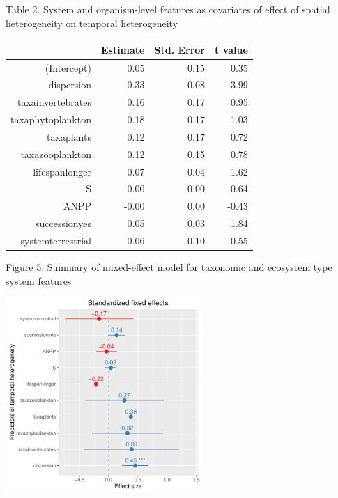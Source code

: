 \documentclass[11pt]{article}
\begin{document}
Table 2. System and organism-level features as covariates of effect of spatial heterogeneity on temporal heterogeneity

\FloatBarrier
\begin{table}[ht]
\centering
\begin{tabular}{rrrr}
  \hline
 & Estimate & Std. Error & t value \\ 
  \hline
(Intercept) & 0.05 & 0.15 & 0.35 \\ 
  dispersion & 0.33 & 0.08 & 3.99 \\ 
  taxainvertebrates & 0.16 & 0.17 & 0.95 \\ 
  taxaphytoplankton & 0.18 & 0.17 & 1.03 \\ 
  taxaplants & 0.12 & 0.17 & 0.72 \\ 
  taxazooplankton & 0.12 & 0.15 & 0.78 \\ 
  lifespanlonger & -0.07 & 0.04 & -1.62 \\ 
  S & 0.00 & 0.00 & 0.64 \\ 
  ANPP & -0.00 & 0.00 & -0.43 \\ 
  successionyes & 0.05 & 0.03 & 1.84 \\ 
  systemterrestrial & -0.06 & 0.10 & -0.55 \\ 
   \hline
\end{tabular}
\end{table}
\FloatBarrier

Figure 5. Summary of mixed-effect model for taxonomic and ecosystem type system features 

\includegraphics[width=280px]{systemmodel}
\end{document}
